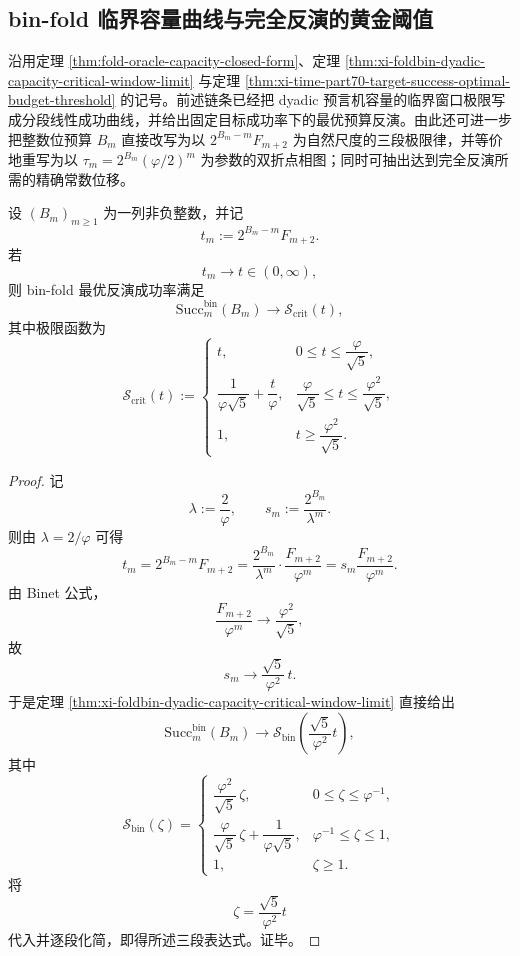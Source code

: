 \subsection{bin-fold 临界容量曲线与完全反演的黄金阈值}\label{subsec:conclusion-binfold-critical-capacity-golden-threshold}
沿用定理 \ref{thm:fold-oracle-capacity-closed-form}、定理 \ref{thm:xi-foldbin-dyadic-capacity-critical-window-limit} 与定理 \ref{thm:xi-time-part70-target-success-optimal-budget-threshold} 的记号。前述链条已经把 dyadic 预言机容量的临界窗口极限写成分段线性成功曲线，并给出固定目标成功率下的最优预算反演。由此还可进一步把整数位预算 \(B_m\) 直接改写为以 \(2^{B_m-m}F_{m+2}\) 为自然尺度的三段极限律，并等价地重写为以 \(\tau_m=2^{B_m}(\varphi/2)^m\) 为参数的双折点相图；同时可抽出达到完全反演所需的精确常数位移。

\begin{theorem}\label{thm:conclusion-binfold-critical-capacity-threephase-law}
设 \((B_m)_{m\ge 1}\) 为一列非负整数，并记
\[
t_m:=2^{B_m-m}F_{m+2}.
\]
若
\[
t_m\longrightarrow t\in(0,\infty),
\]
则 bin-fold 最优反演成功率满足
\[
\mathrm{Succ}_m^{\mathrm{bin}}(B_m)\longrightarrow \mathcal S_{\mathrm{crit}}(t),
\]
其中极限函数为
\[
\mathcal S_{\mathrm{crit}}(t):=
\begin{cases}
t, & 0\le t\le \dfrac{\varphi}{\sqrt5},\\[6pt]
\dfrac{1}{\varphi\sqrt5}+\dfrac{t}{\varphi},
& \dfrac{\varphi}{\sqrt5}\le t\le \dfrac{\varphi^2}{\sqrt5},\\[8pt]
1, & t\ge \dfrac{\varphi^2}{\sqrt5}.
\end{cases}
\]
\end{theorem}
\begin{proof}
记
\[
\lambda:=\frac{2}{\varphi},
\qquad
s_m:=\frac{2^{B_m}}{\lambda^m}.
\]
则由 \(\lambda=2/\varphi\) 可得
\[
t_m
=
2^{B_m-m}F_{m+2}
=
\frac{2^{B_m}}{\lambda^m}\cdot \frac{F_{m+2}}{\varphi^m}
=
s_m\frac{F_{m+2}}{\varphi^m}.
\]
由 Binet 公式，
\[
\frac{F_{m+2}}{\varphi^m}\longrightarrow \frac{\varphi^2}{\sqrt5},
\]
故
\[
s_m\longrightarrow \frac{\sqrt5}{\varphi^2}\,t.
\]
于是定理 \ref{thm:xi-foldbin-dyadic-capacity-critical-window-limit} 直接给出
\[
\mathrm{Succ}_m^{\mathrm{bin}}(B_m)\longrightarrow
\mathcal S_{\mathrm{bin}}\!\left(\frac{\sqrt5}{\varphi^2}t\right),
\]
其中
\[
\mathcal S_{\mathrm{bin}}(\zeta)=
\begin{cases}
\dfrac{\varphi^2}{\sqrt5}\,\zeta, & 0\le \zeta\le \varphi^{-1},\\[6pt]
\dfrac{\varphi}{\sqrt5}\,\zeta+\dfrac{1}{\varphi\sqrt5},
& \varphi^{-1}\le \zeta\le 1,\\[8pt]
1, & \zeta\ge 1.
\end{cases}
\]
将
\[
\zeta=\frac{\sqrt5}{\varphi^2}t
\]
代入并逐段化简，即得所述三段表达式。证毕。
\end{proof}


